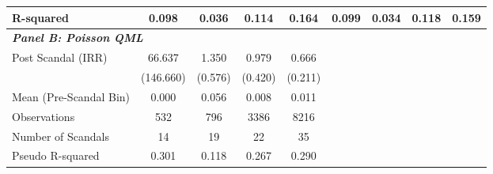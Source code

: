 {\begin{tabular}{l*{8}{c}}
R-squared   &       0.098         &       0.036         &       0.114         &       0.164         &       0.099         &       0.034         &       0.118         &       0.159         \\
\midrule
\multicolumn{9}{l}{\textbf{\textit{Panel B: Poisson QML}}} \\
Post Scandal (IRR)&      66.637\sym{*}  &       1.350         &       0.979         &       0.666          & & & & \\
&   (146.660)         &     (0.576)         &     (0.420)         &     (0.211)          & & & & \\
\midrule
Mean (Pre-Scandal Bin)&       0.000         &       0.056         &       0.008         &       0.011          & & & & \\
Observations&         532         &         796         &        3386         &        8216          & & & & \\
Number of Scandals&          14         &          19         &          22         &          35          & & & & \\
Pseudo R-squared&       0.301         &       0.118         &       0.267         &       0.290          & & & & \\
\bottomrule
\end{tabular}
}
